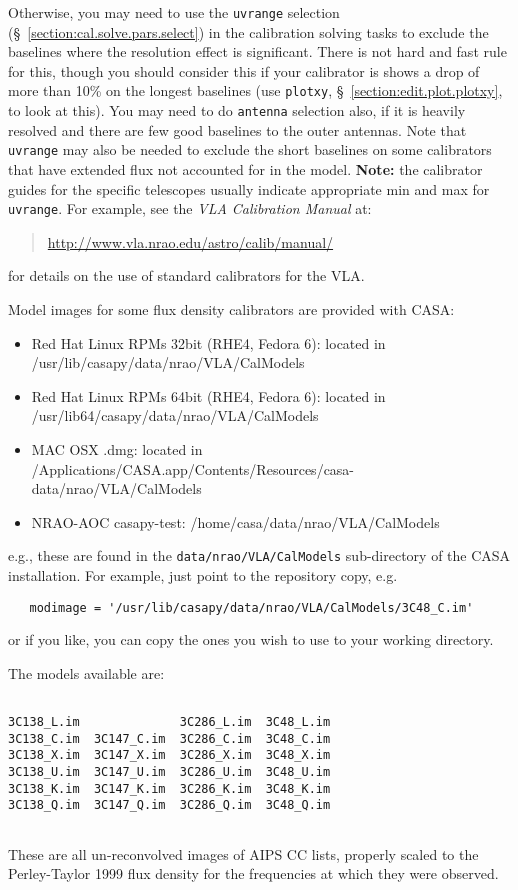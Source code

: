 Otherwise, you may
need to use the {\tt uvrange} selection
(\S~\ref{section:cal.solve.pars.select}) 
in the calibration solving tasks to exclude the baselines
where the resolution effect is significant.  There is not hard
and fast rule for this, though you should consider this if your
calibrator is shows a drop of more than 10\% on the longest baselines
(use {\tt plotxy}, \S~\ref{section:edit.plot.plotxy}, to look at this).
You may need to do {\tt antenna} selection also, if it is heavily
resolved and there are few good baselines to the outer antennas.
Note that {\tt uvrange} may also be needed to exclude the short
baselines on some calibrators that have extended flux not accounted
for in the model.
{\bf Note:} the calibrator guides for the specific telescopes usually
indicate appropriate min and max for {\tt uvrange}. For example,
see the {\em VLA Calibration Manual} at:
\begin{quote}
   \url{http://www.vla.nrao.edu/astro/calib/manual/}
\end{quote}
for details on the use of standard calibrators for the VLA.

Model images for some flux density calibrators are provided with CASA:
\begin{itemize}
   \item Red Hat Linux RPMs 32bit (RHE4, Fedora 6): 
         located in /usr/lib/casapy/data/nrao/VLA/CalModels
   \item Red Hat Linux RPMs 64bit (RHE4, Fedora 6): 
         located in /usr/lib64/casapy/data/nrao/VLA/CalModels
   \item MAC OSX .dmg: located in /Applications/CASA.app/Contents/Resources/casa-data/nrao/VLA/CalModels
   \item NRAO-AOC casapy-test: /home/casa/data/nrao/VLA/CalModels
\end{itemize}
e.g., these are found in the {\tt data/nrao/VLA/CalModels}
sub-directory of the CASA installation.  For example, just point to the
repository copy, e.g.
\small
\begin{verbatim}
   modimage = '/usr/lib/casapy/data/nrao/VLA/CalModels/3C48_C.im'
\end{verbatim}
\normalsize
or if you like, you can copy the ones you wish to use to your working
directory.

The models available are:
\small
\begin{verbatim}

3C138_L.im              3C286_L.im  3C48_L.im
3C138_C.im  3C147_C.im  3C286_C.im  3C48_C.im
3C138_X.im  3C147_X.im  3C286_X.im  3C48_X.im
3C138_U.im  3C147_U.im  3C286_U.im  3C48_U.im
3C138_K.im  3C147_K.im  3C286_K.im  3C48_K.im
3C138_Q.im  3C147_Q.im  3C286_Q.im  3C48_Q.im


\end{verbatim}
\normalsize
These are all un-reconvolved images of AIPS CC lists, properly scaled
to the Perley-Taylor 1999 flux density for the frequencies at which 
they were observed.

